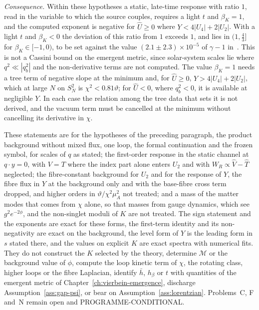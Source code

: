 \emph{Consequence.} Within these hypotheses a static, late-time response with ratio \(1\), read in the variable to which the source couples, requires a light \(t\) and \(\beta_K=1\), and the computed exponent is negative for \(\hat U\ge0\) where \(Y<4|U_4|+2|U_2|\). With a light \(t\) and \(\beta_K<0\) the deviation of this ratio from \(1\) exceeds \(1\), and lies in \((1,\tfrac43]\) for \(\beta_K\in[-1,0)\), to be set against the value \((2.1\pm2.3)\times10^{-5}\) of \(\gamma-1\) in~\cite{Bertotti2003}. This is not a Cassini bound on the emergent metric, since solar-system scales lie where \(q^2\ll|q_b^2|\) and the non-derivative terms are not computed. The value \(\beta_K=1\) needs a tree term of negative slope at the minimum and, for \(\hat U\ge0\), \(Y>4|U_4|+2|U_2|\), which at large \(N\) on \(S^2_N\) is \(\chi^2<0.81\vartheta\); for \(\hat U<0\), where \(q_b^2<0\), it is available at negligible \(Y\). In each case the relation among the tree data that sets it is not derived, and the vacuum term must be cancelled at the minimum without cancelling its derivative in \(\chi\).

These statements are for the hypotheses of the preceding paragraph, the product background without mixed flux, one loop, the formal continuation and the frozen symbol, for scales of \(q\) as stated; the first-order response in the static channel at \(q\cdot y=0\), with \(V=T\) where the index part alone enters \(U_2\) and with \(W_R\propto\hat V-\hat T\) neglected; the fibre-constant background for \(U_2\) and for the response of \(Y\), the fibre flux in \(Y\) at the background only and with the base-fibre cross term dropped, and higher orders in \(\vartheta/\chi^2\mu_A^2\) not treated; and a mass of the matter modes that comes from \(\chi\) alone, so that masses from gauge dynamics, which see \(g^2e^{-2\phi}\), and the non-singlet moduli of \(K\) are not treated. The sign statement and the exponents are exact for these forms, the first-term identity and its non-negativity are exact on the background, the level form of \(Y\) is the leading form in \(s\) stated there, and the values on explicit \(K\) are exact spectra with numerical fits. They do not construct the \(K\) selected by the theory, determine \(\mathcal M\) or the background value of \(\phi\), compute the loop kinetic term of \(\chi\), the rotating class, higher loops or the fibre Laplacian, identify \(\bar h\), \(h_\beta\) or \(t\) with quantities of the emergent metric of Chapter~\ref{ch:vierbein-emergence}, discharge Assumption~\ref{ass:gap-psi}, or bear on Assumption~\ref{ass:lorentzian}. Problems~C, F and~N remain open and PROGRAMME-CONDITIONAL.

